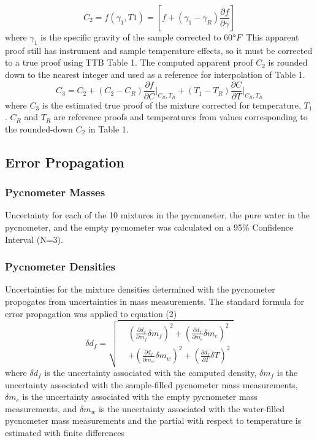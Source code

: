 \documentclass[lettersize,journal]{IEEEtran}
\begin{document}
	\begin{equation}
		\label{deqn_ex4}
		C_{2} = f(\gamma_{1},T1) = [f + (\gamma_{1}-\gamma_{R})\frac{\partial f}{\partial \gamma} ] 
	\end{equation}
	where $\gamma_{1}$ is the specific gravity of the sample corrected to 60$\degree F$
	This apparent proof still has instrument and sample temperature effects, so it must be corrected to a true proof using TTB Table 1. The computed apparent proof $C_{2}$ is rounded down to the nearest integer and used as a reference for interpolation of Table 1.
	\begin{equation}
		\label{deqn_ex5}
		C_3 = C_2 + (C_2 - C_R) \frac{\partial f}{\partial C}\bigg|_{C_R, T_R} + (T_1 - T_R) \frac{\partial C}{\partial T}\bigg|_{C_R, T_R}
	\end{equation}
	where $C_{3}$ is the estimated true proof of the mixture corrected for temperature, $T_{1}$. $C_{R}$ and $T_{R}$ are reference proofs and temperatures from values corresponding to the rounded-down $C_{2}$ in Table 1.
	
	\subsection{Error Propagation}
	\subsubsection{Pycnometer Masses}
	 Uncertainty for each of the 10 mixtures in the pycnometer, the pure water in the pycnometer, and the empty pycnometer was calculated on a 95\% Confidence Interval (N=3). 
	\subsubsection{Pycnometer Densities}
	Uncertainties for the mixture densities determined with the pycnometer propogates from uncertainties in mass measurements. The standard formula for error propagation was applied to equation (2)
	\begin{equation}
		\label{deqn_ex6}
		\delta d_{f} = \sqrt{
			\begin{aligned}
				&\left(\frac{\partial d_{f}}{\partial m_{f}}\delta m_{f}\right)^2 + 
				\left(\frac{\partial d_{f}}{\partial m_{e}}\delta m_{e}\right)^2 \\
				&+ \left(\frac{\partial d_{f}}{\partial m_{w}}\delta m_{w}\right)^2 + 
				\left(\frac{\partial d_{f}}{\partial T}\delta T\right)^2
			\end{aligned}
		}
	\end{equation}
	where $\delta d_{f}$ is the uncertainty associated with the computed density, $\delta m_{f}$ is the uncertainty associated with the sample-filled pycnometer mass measurements, $\delta m_{e}$ is the uncertainty associated with the empty pycnometer mass measurements, and $\delta m_{w}$ is the uncertainty associated with the water-filled pycnometer mass measurements and the partial with respect to temperature is estimated with finite differences  
\end{document}
